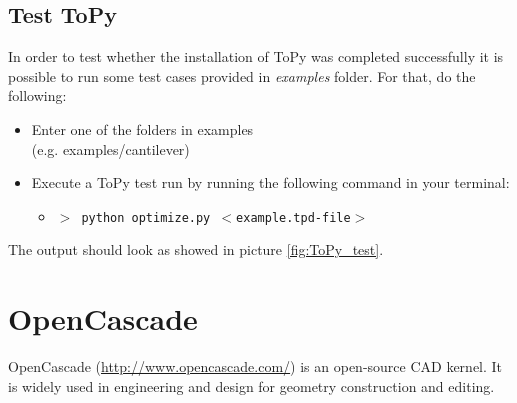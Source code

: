 \documentclass[
12pt, %
a4paper, %
oneside, %
headinclude,footinclude, %
BCOR5mm, %
]{scrartcl}
\begin{document}
\subsection{Test ToPy}
	In order to test whether the installation of ToPy was completed successfully it is possible to run some test cases provided in \textit{examples} folder. For that, do the following:
\begin{itemize}
	\item Enter one of the folders in examples \\(e.g. examples/cantilever)
	\item Execute a ToPy test run by running the following command in your terminal:
\begin{itemize}
	\item[] \texttt{\textbf{$>$ }python optimize.py $<$example.tpd-file$>$}
\end{itemize}
\end{itemize}
%
The output should look as showed in picture \ref{fig:ToPy_test}.

\section{OpenCascade}
\label{OpenCascade}
OpenCascade (\href{http://www.opencascade.com/}{http://www.opencascade.com/}) is an open-source CAD kernel. It is widely used in engineering and design for geometry construction and editing.
\end{document}
